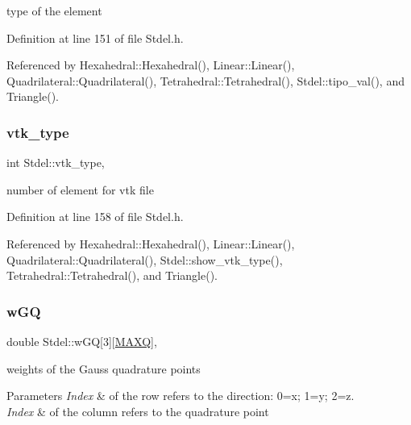 type of the element 



Definition at line 151 of file Stdel.\+h.



Referenced by Hexahedral\+::\+Hexahedral(), Linear\+::\+Linear(), Quadrilateral\+::\+Quadrilateral(), Tetrahedral\+::\+Tetrahedral(), Stdel\+::tipo\+\_\+val(), and Triangle().

\mbox{\label{classStdel_a55624584790a08437c03540489d04898}} 
\subsubsection{\texorpdfstring{vtk\+\_\+type}{vtk\_type}}
{\footnotesize\ttfamily int Stdel\+::vtk\+\_\+type\hspace{0.3cm}{\ttfamily [protected]}, {\ttfamily [inherited]}}



number of element for vtk file 



Definition at line 158 of file Stdel.\+h.



Referenced by Hexahedral\+::\+Hexahedral(), Linear\+::\+Linear(), Quadrilateral\+::\+Quadrilateral(), Stdel\+::show\+\_\+vtk\+\_\+type(), Tetrahedral\+::\+Tetrahedral(), and Triangle().

\mbox{\label{classStdel_af99d72cbda49c30e23e83705c95a1c5b}} 
\subsubsection{\texorpdfstring{w\+GQ}{wGQ}}
{\footnotesize\ttfamily double Stdel\+::w\+GQ\mbox{[}3\mbox{]}\mbox{[}\hyperlink{MyOptions_8h_af708e94d886ba3f59582612949cac702}{M\+A\+XQ}\mbox{]}\hspace{0.3cm}{\ttfamily [protected]}, {\ttfamily [inherited]}}

weights of the Gauss quadrature points 
\begin{DoxyParams}{Parameters}
{\em Index} & of the row refers to the direction\+: 0=x; 1=y; 2=z. \\
\hline
{\em Index} & of the column refers to the quadrature point \\
\hline
\end{DoxyParams}


